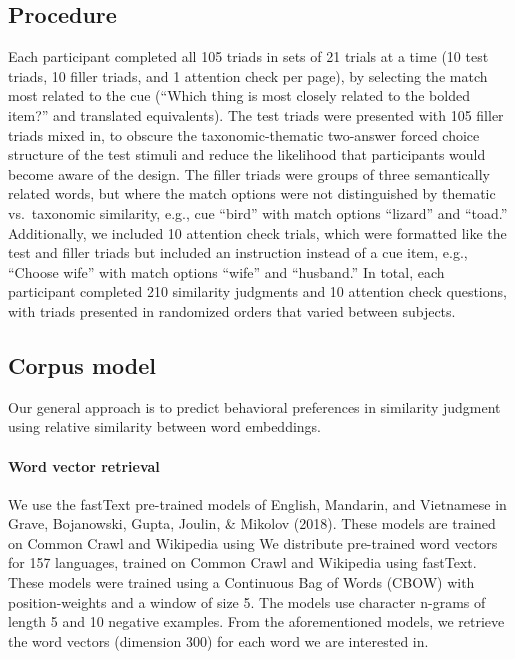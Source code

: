 \documentclass[10pt, letterpaper]{article}
\begin{document}
\hypertarget{procedure}{%
\subsection{Procedure}\label{procedure}}

Each participant completed all 105 triads in sets of 21 trials at a time
(10 test triads, 10 filler triads, and 1 attention check per page), by
selecting the match most related to the cue (``Which thing is most
closely related to the bolded item?'' and translated equivalents). The
test triads were presented with 105 filler triads mixed in, to obscure
the taxonomic-thematic two-answer forced choice structure of the test
stimuli and reduce the likelihood that participants would become aware
of the design. The filler triads were groups of three semantically
related words, but where the match options were not distinguished by
thematic vs.~taxonomic similarity, e.g., cue ``bird'' with match options
``lizard'' and ``toad.'' Additionally, we included 10 attention check
trials, which were formatted like the test and filler triads but
included an instruction instead of a cue item, e.g., ``Choose wife''
with match options ``wife'' and ``husband.'' In total, each participant
completed 210 similarity judgments and 10 attention check questions,
with triads presented in randomized orders that varied between subjects.

\hypertarget{corpus-model}{%
\subsection{Corpus model}\label{corpus-model}}

Our general approach is to predict behavioral preferences in similarity
judgment using relative similarity between word embeddings.

\hypertarget{word-vector-retrieval}{%
\paragraph{Word vector retrieval}\label{word-vector-retrieval}}

We use the fastText pre-trained models of English, Mandarin, and
Vietnamese in Grave, Bojanowski, Gupta, Joulin, \& Mikolov (2018). These
models are trained on Common Crawl and Wikipedia using We distribute
pre-trained word vectors for 157 languages, trained on Common Crawl and
Wikipedia using fastText. These models were trained using a Continuous
Bag of Words (CBOW) with position-weights and a window of size 5. The
models use character n-grams of length 5 and 10 negative examples. From
the aforementioned models, we retrieve the word vectors (dimension 300)
for each word we are interested in.
\end{document}
